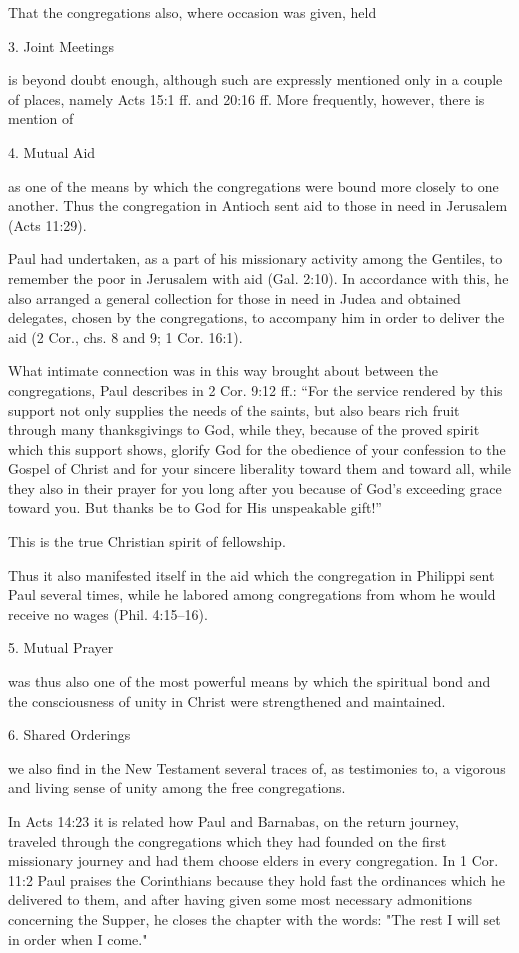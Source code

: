 That the congregations also, where occasion was given, held

3. Joint Meetings

is beyond doubt enough, although such are expressly mentioned only in a couple of places, namely Acts 15:1 ff. and 20:16 ff. More frequently, however, there is mention of

4. Mutual Aid

as one of the means by which the congregations were bound more closely to one another. Thus the congregation in Antioch sent aid to those in need in Jerusalem (Acts 11:29).

Paul had undertaken, as a part of his missionary activity among the Gentiles, to remember the poor in Jerusalem with aid (Gal. 2:10). In accordance with this, he also arranged a general collection for those in need in Judea and obtained delegates, chosen by the congregations, to accompany him in order to deliver the aid (2 Cor., chs. 8 and 9; 1 Cor. 16:1).

What intimate connection was in this way brought about between the congregations, Paul describes in 2 Cor. 9:12 ff.: “For the service rendered by this support not only supplies the needs of the saints, but also bears rich fruit through many thanksgivings to God, while they, because of the proved spirit which this support shows, glorify God for the obedience of your confession to the Gospel of Christ and for your sincere liberality toward them and toward all, while they also in their prayer for you long after you because of God’s exceeding grace toward you. But thanks be to God for His unspeakable gift!”

This is the true Christian spirit of fellowship.

Thus it also manifested itself in the aid which the congregation in Philippi sent Paul several times, while he labored among congregations from whom he would receive no wages (Phil. 4:15–16).





5. Mutual Prayer

was thus also one of the most powerful means by which the spiritual bond and the consciousness of unity in Christ were strengthened and maintained.

6. Shared Orderings

we also find in the New Testament several traces of, as testimonies to, a vigorous and living sense of unity among the free congregations.

In Acts 14:23 it is related how Paul and Barnabas, on the return journey, traveled through the congregations which they had founded on the first missionary journey and had them choose elders in every congregation. In 1 Cor. 11:2 Paul praises the Corinthians because they hold fast the ordinances which he delivered to them, and after having given some most necessary admonitions concerning the Supper, he closes the chapter with the words: "The rest I will set in order when I come."

